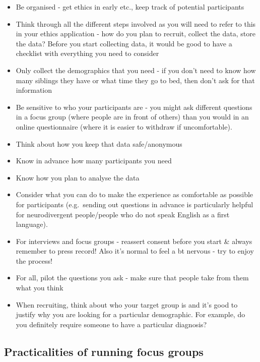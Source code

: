 \documentclass[
  english,
  letterpaper,
  DIV=11,
  numbers=noendperiod]{scrreprt}
\providecommand{\tightlist}{%
  \setlength{\itemsep}{0pt}\setlength{\parskip}{0pt}}
\begin{document}
\begin{itemize}
\tightlist
\item
  Be organised - get ethics in early etc., keep track of potential
  participants
\item
  Think through all the different steps involved as you will need to
  refer to this in your ethics application - how do you plan to recruit,
  collect the data, store the data? Before you start collecting data, it
  would be good to have a checklist with everything you need to consider
\item
  Only collect the demographics that you need - if you don't need to
  know how many siblings they have or what time they go to bed, then
  don't ask for that information
\item
  Be sensitive to who your participants are - you might ask different
  questions in a focus group (where people are in front of others) than
  you would in an online questionnaire (where it is easier to withdraw
  if uncomfortable).
\item
  Think about how you keep that data safe/anonymous
\item
  Know in advance how many participants you need
\item
  Know how you plan to analyse the data
\item
  Consider what you can do to make the experience as comfortable as
  possible for participants (e.g.~sending out questions in advance is
  particularly helpful for neurodivergent people/people who do not speak
  English as a first language).
\item
  For interviews and focus groups - reassert consent before you start \&
  always remember to press record! Also it's normal to feel a bt nervous
  - try to enjoy the process!
\item
  For all, pilot the questions you ask - make sure that people take from
  them what you think
\item
  When recruiting, think about who your target group is and it's good to
  justify why you are looking for a particular demographic. For example,
  do you definitely require someone to have a particular diagnosis?
\end{itemize}

\subsection{Practicalities of running focus
groups}\label{practicalities-of-running-focus-groups}
\end{document}
